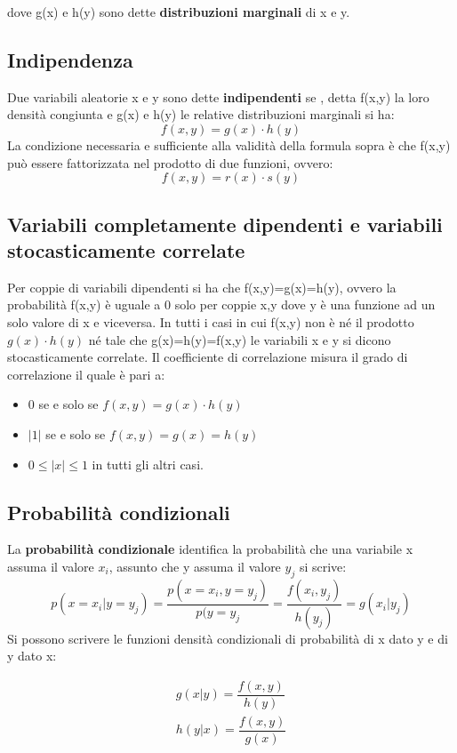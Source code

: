 dove g(x) e h(y) sono dette \textbf{distribuzioni marginali} di x e y.

\subsection{Indipendenza}
Due variabili aleatorie x e y sono dette \textbf{indipendenti} se , detta f(x,y) la loro densità congiunta e g(x) e h(y) le relative distribuzioni marginali si ha:
\[ f(x,y) = g(x) \cdot h(y)\]
La condizione necessaria e sufficiente alla validità della formula sopra è che f(x,y) può essere fattorizzata nel prodotto di due funzioni, ovvero:
\[f(x,y) = r(x) \cdot s(y)\]

\subsection{Variabili completamente dipendenti e variabili stocasticamente correlate}
Per coppie di variabili dipendenti si ha che f(x,y)=g(x)=h(y), ovvero la probabilità f(x,y) è uguale a 0 solo per coppie x,y dove y è una funzione ad un solo valore di x e viceversa.
In tutti i casi in cui f(x,y) non è né il prodotto $g(x) \cdot h(y)$ né tale che g(x)=h(y)=f(x,y) le variabili x e y si dicono stocasticamente correlate.
Il coefficiente di correlazione misura il grado di correlazione il quale è pari a:
\begin{itemize}
    \item 0 se e solo se $f(x,y) = g(x) \cdot h(y)$
    \item $|1|$ se e solo se $f(x,y)=g(x)=h(y)$
    \item $0\leq |x| \leq 1$ in tutti gli altri casi.
\end{itemize}

\subsection{Probabilità condizionali}
La \textbf{probabilità condizionale} identifica la probabilità che una variabile x assuma il valore $x_i$, assunto che y assuma il valore $y_j$ si scrive:
\[p(x=x_i|y=y_j) = \dfrac{p(x=x_i,y=y_j)}{p(y=y_j}= \dfrac{f(x_i,y_j)}{h(y_j)}= g(x_i|y_j)\]
Si possono scrivere le funzioni densità condizionali di probabilità di x dato y e di y dato x:

 \begin{align*}
     g(x|y) =\dfrac{f(x,y)}{h(y)} \\
     h(y|x) = \dfrac{f(x,y)}{g(x)}
 \end{align*}
 

